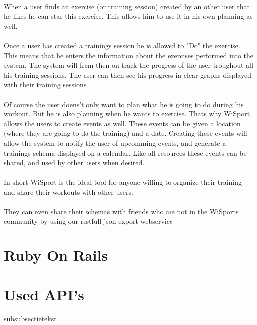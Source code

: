 \documentclass[11pt,a4paper]{scrartcl}
\begin{document}
\paragraph{}When a user finds an exercise (or training session) created by an other user that he likes he can star this exercise. This allows him to use it in his own planning as well.
\paragraph{}Once a user has created a trainings session he is allowed to "Do" the exercise. This means that he enters the information about the exercises performed into the system. The system will from then on track the progress of the user troughout all his training sessions. The user can then see his progress in clear graphs displayed with their training sessions.
\paragraph{}Of course the user doens't only want to plan what he is going to do during his workout. But he is also planning when he wants to exercise. Thats why WiSport allows the users to create events as well. These events can be given a location (where they are going to do the training) and a date. Creating these events will allow the system to notify the user of upcomming events, and generate a trainings schema displayed on a calendar. Like all resources these events can be shared, and used by other users when desired.
\paragraph{}In short WiSport is the ideal tool for anyone willing to organize their training and share their workouts with other users.
\paragraph{}They can even share their schemas with friends who are not in the WiSports community by using our restfull json export webservice

\section{Ruby On Rails}

\section{Used API's}
subsubsectietekst
\end{document}
